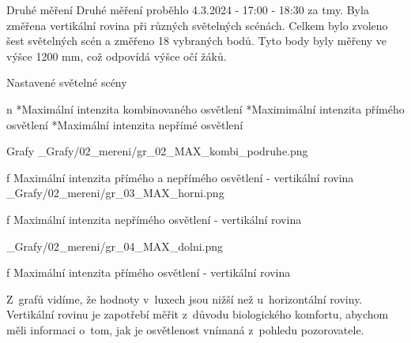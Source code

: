 \sec Druhé měření
Druhé měření proběhlo 4.3.2024 - 17:00 - 18:30 za tmy. Byla změřena vertikální rovina při různých světelných scénách.
Celkem bylo zvoleno šest světelných scén a změřeno 18 vybraných bodů. Tyto body byly měřeny ve výšce 1200 mm,
což odpovídá výšce očí žáků.
\medskip

{\sbf Nastavené světelné scény}

\begitems \style n
    *Maximální intenzita kombinovaného osvětlení
    *Maximimální intenzita přímého osvětlení
    *Maximální intenzita nepřímé osvětlení
\enditems

\secc Grafy
\medskip {}
\picw=15cm _Grafy/02_mereni/gr_02_MAX_kombi_podruhe.png
\caption/f Maximální intenzita přímého a nepřímého osvětlení - vertikální rovina
\medskip {}
\picw=15cm _Grafy/02_mereni/gr_03_MAX_horni.png
\caption/f Maximální intenzita nepřímého osvětlení - vertikální rovina

\medskip {}
\picw=15cm _Grafy/02_mereni/gr_04_MAX_dolni.png
\caption/f Maximální intenzita přímého osvětlení - vertikální rovina
\medskip

Z~grafů vidíme, že hodnoty v~luxech jsou nižší než u~horizontální roviny. Vertikální rovinu je zapotřebí měřit z~důvodu biologického komfortu, abychom měli informaci o~tom, jak je osvětlenost vnímaná z~pohledu pozorovatele.



